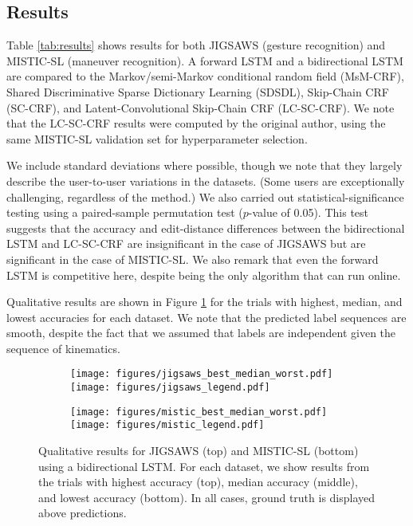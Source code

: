 \documentclass{llncs}
\begin{document}
\subsection{Results}

Table \ref{tab:results} shows results for both JIGSAWS (gesture recognition) and MISTIC-SL (maneuver recognition). A forward LSTM and a bidirectional LSTM are compared to the Markov/semi-Markov conditional random field (MsM-CRF), Shared Discriminative Sparse Dictionary Learning (SDSDL), Skip-Chain CRF (SC-CRF), and Latent-Convolutional Skip-Chain CRF (LC-SC-CRF). We note that the LC-SC-CRF results were computed by the original author, using the same MISTIC-SL validation set for hyperparameter selection.

We include standard deviations where possible, though we note that they largely describe the user-to-user variations in the datasets. (Some users are exceptionally challenging, regardless of the method.) We also carried out statistical-significance testing using a paired-sample permutation test ($p$-value of 0.05). This test suggests that the accuracy and edit-distance differences between the bidirectional LSTM and LC-SC-CRF are insignificant in the case of JIGSAWS but are significant in the case of MISTIC-SL. We also remark that even the forward LSTM is competitive here, despite being the only algorithm that can run online.

Qualitative results are shown in Figure \ref{fig:results} for the trials with highest, median, and lowest accuracies for each dataset. We note that the predicted label sequences are smooth, despite the fact that we assumed that labels are independent given the sequence of kinematics.

\begin{figure}[t]
	\centering
	\begin{subfigure}[b]{1.0\textwidth}
		\centering
		\texttt{[image: figures/jigsaws\_best\_median\_worst.pdf]}
		\texttt{[image: figures/jigsaws\_legend.pdf]}
	\end{subfigure}
	\hfill
	\begin{subfigure}[b]{1.0\textwidth}
		\centering
		\texttt{[image: figures/mistic\_best\_median\_worst.pdf]}
		\texttt{[image: figures/mistic\_legend.pdf]}
	\end{subfigure}
	\caption{Qualitative results for JIGSAWS (top) and MISTIC-SL (bottom) using a bidirectional LSTM. For each dataset, we show results from the trials with highest accuracy (top), median accuracy (middle), and lowest accuracy (bottom). In all cases, ground truth is displayed above predictions.}
	\label{fig:results}
\end{figure}
\end{document}
